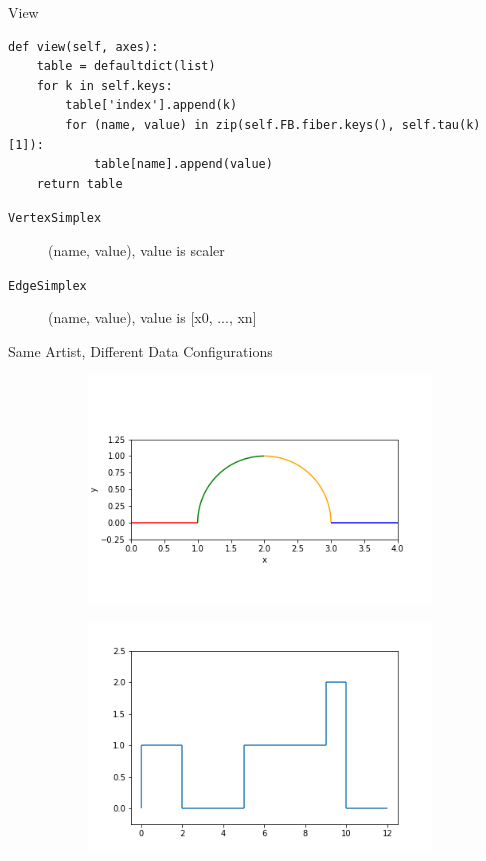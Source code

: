 \documentclass[xcolor={dvipsnames}, handout]{beamer}
\begin{document}
\begin{frame}[fragile]{View}
\begin{verbatim}
def view(self, axes):
    table = defaultdict(list)
    for k in self.keys:
        table['index'].append(k)
        for (name, value) in zip(self.FB.fiber.keys(), self.tau(k)[1]):
            table[name].append(value)
    return table
\end{verbatim}
\begin{description}
    \item [\texttt{VertexSimplex}] (name, value), value is scaler
    \item [\texttt{EdgeSimplex}]  (name, value), value is [x0, ..., xn]
\end{description}
\end{frame}
\begin{frame}[fragile]{Same Artist, Different Data Configurations}
    \begin{figure}[H]
        \begin{subfigure}{0.49\textwidth}
            \includegraphics[width=\textwidth]{figures/code/linec_1.png}
        \end{subfigure}
        \begin{subfigure}{0.49\textwidth}
            \includegraphics[width=\textwidth]{figures/code/lined_1.png}

\end{subfigure}
\end{figure}
\end{frame}
\end{document}
